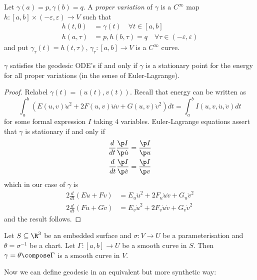 \documentclass[a4paper]{article}
\theoremstyle{definition}
\begin{document}
\begin{definition}
  Let \(\gamma(a) = p, \gamma(b) = q\). A \emph{proper variation} of \(\gamma\) is a \(C^\infty\) map \(h: [a, b] \times (-\varepsilon, \varepsilon) \to V\) such that
  \begin{align*}
    h(t, 0) &= \gamma(t) \quad \forall t \in [a, b] \\
    h(a, \tau) &= p, h(b, \tau) = q \quad \forall \tau \in (-\varepsilon, \varepsilon)
  \end{align*}
  and put \(\gamma_\tau(t) = h(t, \tau)\), \(\gamma_\tau: [a, b] \to V\) is a \(C^\infty\) curve.
\end{definition}

\begin{proposition}
  \(\gamma\) satisfies the geodesic ODE's if and only if \(\gamma\) is a stationary point for the energy for all proper variations (in the sense of Euler-Lagrange).
\end{proposition}

\begin{proof}
  Relabel \(\gamma(t) = (u(t), v(t))\). Recall that energy can be written as
  \[
    \int_a^b (E(u, v) \dot u^2 + 2F(u, v) \dot u \dot v + G(u, v) \dot v^2) dt
    = \int_a^b I(u, v, \dot u, \dot v) dt
  \]
  for some formal expression \(I\) taking 4 variables. Euler-Lagrange equations assert that \(\gamma\) is stationary if and only if
  \begin{align*}
    \frac{d}{dt} \frac{\p I}{\p \dot u} &= \frac{\p I}{\p u} \\
    \frac{d}{dt} \frac{\p I}{\p \dot v} &= \frac{\p I}{\p v}
  \end{align*}
  which in our case of \(\gamma\) is
  \begin{align*}
    2 \frac{d}{dt} (E \dot u + F \dot v) &= E_u \dot u^2 + 2F_u \dot u \dot v + G_u \dot v^2 \\ 
    2 \frac{d}{dt} (F \dot u + G \dot v) &= E_v \dot u^2 + 2F_v \dot u \dot v + G_v \dot v^2
  \end{align*}
  and the result follows.
\end{proof}

Let \(S \subseteq \R^3\) be an embedded surface and \(\sigma: V \to U\) be a parameterisation and \(\theta = \sigma^{-1}\) be a chart. Let \(\Gamma: [a, b] \to U\) be a smooth curve in \(S\). Then \(\gamma = \theta \compose \Gamma\) is a smooth curve in \(V\).

Now we can define geodesic in an equivalent but more synthetic way:
\end{document}
